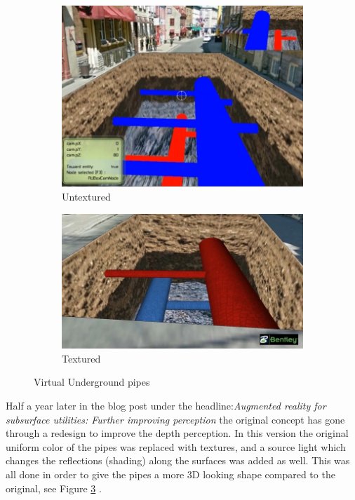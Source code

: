 \begin{figure}
	\centering
	\begin{subfigure}[h!]{\textwidth}
		\includegraphics[width=\textwidth]{figures/pipes_0.jpg}
		\caption{Untextured}\label{fig:pipes0}
	\end{subfigure}
	\begin{subfigure}[h!]{\textwidth}
		\includegraphics[width=\textwidth]{figures/pipes_1.jpg}
		\caption{Textured}\label{fig:pipes1}
	\end{subfigure}
	\caption{Virtual Underground pipes \cite{Cote2011}}
\end{figure}

Half a year later in the blog post under the headline:\textit{Augmented reality for subsurface utilities: Further improving perception} the original concept has gone through a redesign to improve the depth perception. In this version the original uniform color of the pipes was replaced with textures, and a source light which changes the reflections (shading) along the surfaces was added as well. This was all done in order to give the pipes a more 3D looking shape compared to the original, see Figure \ref{fig:pipes1} \cite{Cote2011}.

